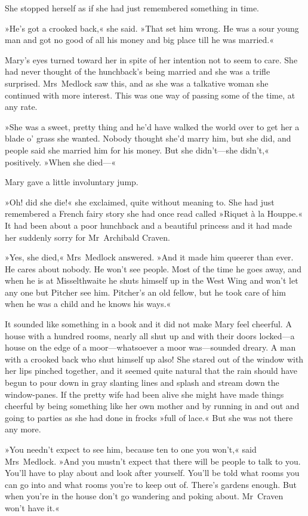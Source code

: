 She stopped herself as if she had just remembered something in time.

»He's got a crooked back,« she said. »That set him wrong. He was a sour young man and got no good of all his money and big place till he was married.«

Mary's eyes turned toward her in spite of her intention not to seem to care. She had never thought of the hunchback's being married and she was a trifle surprised. Mrs~Medlock saw this, and as she was a talkative woman she continued with more interest. This was one way of passing some of the time, at any rate.

»She was a sweet, pretty thing and he'd have walked the world over to get her a blade o' grass she wanted. Nobody thought she'd marry him, but she did, and people said she married him for his money. But she didn't—she didn't,« positively. »When she died—«

Mary gave a little involuntary jump.

»Oh! did she die!« she exclaimed, quite without meaning to. She had just remembered a French fairy story she had once read called »Riquet à la Houppe.« It had been about a poor hunchback and a beautiful princess and it had made her suddenly sorry for Mr~Archibald Craven.

»Yes, she died,« Mrs~Medlock answered. »And it made him queerer than ever. He cares about nobody. He won't see people. Most of the time he goes away, and when he is at Misselthwaite he shuts himself up in the West Wing and won't let any one but Pitcher see him. Pitcher's an old fellow, but he took care of him when he was a child and he knows his ways.«

It sounded like something in a book and it did not make Mary feel cheerful. A house with a hundred rooms, nearly all shut up and with their doors locked—a house on the edge of a moor—whatsoever a moor was—sounded dreary. A man with a crooked back who shut himself up also! She stared out of the window with her lips pinched together, and it seemed quite natural that the rain should have begun to pour down in gray slanting lines and splash and stream down the window-panes. If the pretty wife had been alive she might have made things cheerful by being something like her own mother and by running in and out and going to parties as she had done in frocks »full of lace.« But she was not there any more.

»You needn't expect to see him, because ten to one you won't,« said Mrs~Medlock. »And you mustn't expect that there will be people to talk to you. You'll have to play about and look after yourself. You'll be told what rooms you can go into and what rooms you're to keep out of. There's gardens enough. But when you're in the house don't go wandering and poking about. Mr~Craven won't have it.«

